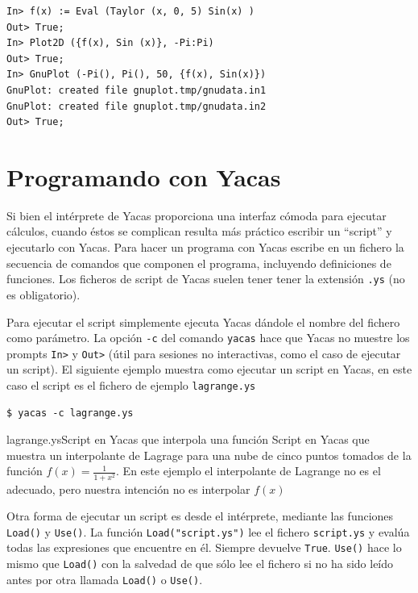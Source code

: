 \begin{verbatim}
In> f(x) := Eval (Taylor (x, 0, 5) Sin(x) )
Out> True;
In> Plot2D ({f(x), Sin (x)}, -Pi:Pi)
Out> True;
In> GnuPlot (-Pi(), Pi(), 50, {f(x), Sin(x)})
GnuPlot: created file gnuplot.tmp/gnudata.in1
GnuPlot: created file gnuplot.tmp/gnudata.in2
Out> True;
\end{verbatim}

\section{Programando con Yacas}


Si bien  el intérprete de  Yacas proporciona una interfaz  cómoda para
ejecutar  cálculos, cuando  éstos  se complican  resulta más  práctico
escribir un ``script'' y ejecutarlo  con Yacas. Para hacer un programa
con Yacas escribe en un fichero  la secuencia de comandos que componen
el  programa, incluyendo  definiciones de  funciones. Los  ficheros de
script  de Yacas  suelen tener  tener la  extensión {\tt  .ys} (no  es
obligatorio).  

Para ejecutar  el script simplemente  ejecuta Yacas dándole  el nombre
del fichero como parámetro. La opción {\tt -c} del comando {\tt yacas}
hace que Yacas  no muestre los prompts \verb+In>+  y \verb+Out>+ (útil
para sesiones no interactivas, como el caso de ejecutar un script). El
siguiente ejemplo  muestra como ejecutar  un script en Yacas,  en este
caso el script es el fichero de ejemplo {\tt lagrange.ys}

\begin{verbatim}
$ yacas -c lagrange.ys
\end{verbatim}

\begin{ejemplo}{lagrange.ys}{Script en Yacas que interpola una función}
Script en Yacas  que muestra un interpolante de Lagrage  para una nube
de cinco  puntos tomados  de la función  $f(x) =  \frac{1}{1+x^2}$. En
este  ejemplo el  interpolante de  Lagrange  no es  el adecuado,  pero
nuestra intención  no es interpolar  $f(x)$
\end{ejemplo}

Otra   forma  de   ejecutar  un   script  es   desde  el   intérprete,
mediante  las  funciones  \verb+Load()+  y  \verb+Use()+.  La  función
\verb+Load("script.ys")+  lee  el  fichero \verb+script.ys+  y  evalúa
todas  las   expresiones  que   encuentre  en  él.   Siempre  devuelve
\verb+True+.  \verb+Use()+  hace lo  mismo  que  \verb+Load()+ con  la
salvedad de que sólo lee el fichero si no ha sido leído antes por otra
llamada \verb+Load()+ o \verb+Use()+.

